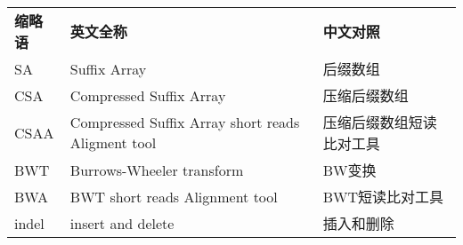 \begin{abbreviation}\renewcommand{\arraystretch}{1.3}
\noindent
\begin{table}[ht]
\begin{tabular}{p{2cm}p{6cm}p{8cm}}
\textbf{缩略语}&\textbf{英文全称}&\textbf{中文对照}\\
SA &Suffix Array &后缀数组\\
CSA & Compressed Suffix Array &压缩后缀数组\\
CSAA & Compressed Suffix Array short reads Aligment tool & 压缩后缀数组短读比对工具\\
BWT & Burrows-Wheeler transform&BW变换\\
BWA & BWT short reads Alignment tool & BWT短读比对工具\\
indel & insert and delete &插入和删除\\
\end{tabular}
\end{table}
\end{abbreviation}
